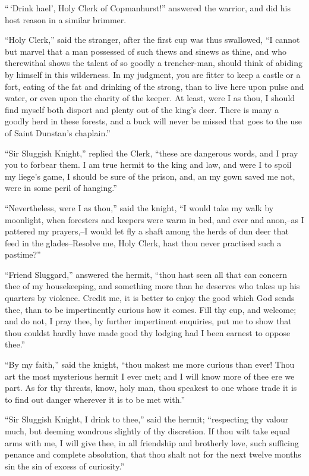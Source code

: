 ``\,`Drink hael', Holy Clerk of Copmanhurst!'' answered the warrior, and
did his host reason in a similar brimmer.

``Holy Clerk,'' said the stranger, after the first cup was thus
swallowed, ``I cannot but marvel that a man possessed of such thews and
sinews as thine, and who therewithal shows the talent of so goodly a
trencher-man, should think of abiding by himself in this wilderness. In
my judgment, you are fitter to keep a castle or a fort, eating of the
fat and drinking of the strong, than to live here upon pulse and water,
or even upon the charity of the keeper. At least, were I as thou, I
should find myself both disport and plenty out of the king's deer. There
is many a goodly herd in these forests, and a buck will never be missed
that goes to the use of Saint Dunstan's chaplain.''

``Sir Sluggish Knight,'' replied the Clerk, ``these are dangerous words,
and I pray you to forbear them. I am true hermit to the king and law,
and were I to spoil my liege's game, I should be sure of the prison,
and, an my gown saved me not, were in some peril of hanging.''

``Nevertheless, were I as thou,'' said the knight, ``I would take my
walk by moonlight, when foresters and keepers were warm in bed, and ever
and anon,--as I pattered my prayers,--I would let fly a shaft among the
herds of dun deer that feed in the glades--Resolve me, Holy Clerk, hast
thou never practised such a pastime?''

``Friend Sluggard,'' answered the hermit, ``thou hast seen all that can
concern thee of my housekeeping, and something more than he deserves who
takes up his quarters by violence. Credit me, it is better to enjoy the
good which God sends thee, than to be impertinently curious how it
comes. Fill thy cup, and welcome; and do not, I pray thee, by further
impertinent enquiries, put me to show that thou couldst hardly have made
good thy lodging had I been earnest to oppose thee.''

``By my faith,'' said the knight, ``thou makest me more curious than
ever! Thou art the most mysterious hermit I ever met; and I will know
more of thee ere we part. As for thy threats, know, holy man, thou
speakest to one whose trade it is to find out danger wherever it is to
be met with.''

``Sir Sluggish Knight, I drink to thee,'' said the hermit; ``respecting
thy valour much, but deeming wondrous slightly of thy discretion. If
thou wilt take equal arms with me, I will give thee, in all friendship
and brotherly love, such sufficing penance and complete absolution, that
thou shalt not for the next twelve months sin the sin of excess of
curiosity.''

